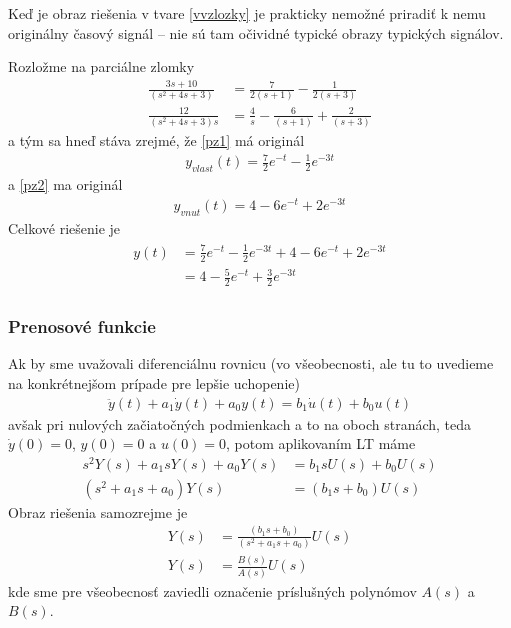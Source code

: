 \documentclass[a4paper, 10pt, ]{article}
\begin{document}
Keď je obraz riešenia v tvare \eqref{vvzlozky} je prakticky nemožné priradiť k nemu originálny časový signál -- nie sú tam očividné typické obrazy typických signálov.

Rozložme na parciálne zlomky
\begin{align}
    \frac{3s + 10}{\left( s^2   + 4s  + 3\right)} &= \frac{7}{2(s+1)} - \frac{1}{2(s+3)} \label{pz1} \\
    \frac{12}{\left( s^2   + 4s  + 3\right) s} &= \frac{4}{s} - \frac{6}{(s+1)} + \frac{2}{(s+3)} \label{pz2}
\end{align}
a tým sa hneď stáva zrejmé, že \eqref{pz1} má originál
\begin{align}
    y_{vlast}(t) = \frac{7}{2} e^{-t} - \frac{1}{2} e^{-3t}
\end{align}
a \eqref{pz2} ma originál
\begin{align}
    y_{vnut}(t) = 4 - 6 e^{-t} + 2 e^{-3t}
\end{align}
Celkové riešenie je
\begin{align}
    \begin{aligned}
        y(t) &= \frac{7}{2} e^{-t} - \frac{1}{2} e^{-3t} +  4 - 6 e^{-t} + 2 e^{-3t} \\
        &= 4 - \frac{5}{2} e^{-t} + \frac{3}{2} e^{-3t}
    \end{aligned}
\end{align}



\subsubsection{Prenosové funkcie}

Ak by sme uvažovali diferenciálnu rovnicu (vo všeobecnosti, ale tu to uvedieme na konkrétnejšom prípade pre lepšie uchopenie)
\begin{align}
    \ddot y(t) + a_1 \dot y(t) + a_0 y(t) = b_1 \dot u(t) + b_0 u(t)
\end{align}
avšak pri nulových začiatočných podmienkach a to na oboch stranách, teda $\dot y(0) = 0$, $y(0) = 0$ a $u(0) = 0$, potom aplikovaním LT máme
\begin{align}
    s^2 Y(s)   + a_1 s Y(s)  + a_0 Y(s) &= b_1 s U(s) + b_0 U(s) \\
    (s^2   + a_1 s   + a_0) Y(s) &= (b_1 s  + b_0) U(s)
\end{align}
Obraz riešenia samozrejme je
\begin{align}
    Y(s) &= \frac{(b_1 s  + b_0)}{(s^2   + a_1 s   + a_0)} U(s) \\
    Y(s) &= \frac{B(s)}{A(s)} U(s)
\end{align}
kde sme pre všeobecnosť zaviedli označenie príslušných polynómov $A(s)$ a $B(s)$.
\end{document}
